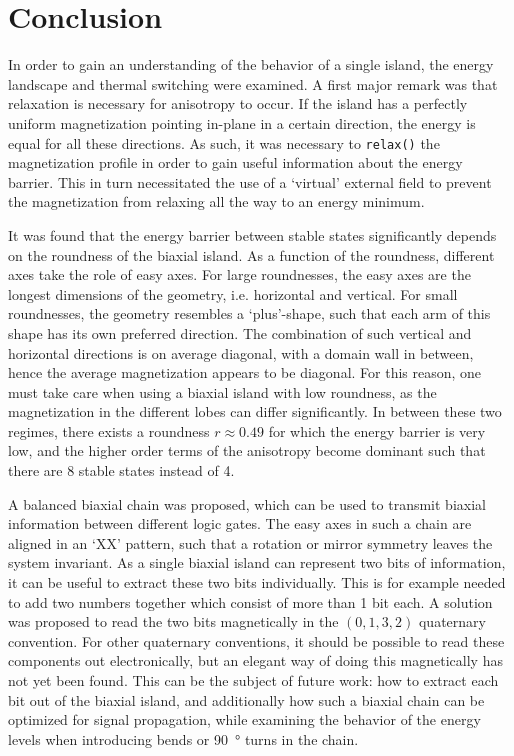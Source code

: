 \documentclass[11pt,a4paper,english]{article}
\newcommand{\code}[1]{\texttt{#1}}
\begin{document}
\clearpage
\section{Conclusion}
In order to gain an understanding of the behavior of a single island, the energy landscape and thermal switching were examined. A first major remark was that relaxation is necessary for anisotropy to occur. If the island has a perfectly uniform magnetization pointing in-plane in a certain direction, the energy is equal for all these directions. As such, it was necessary to \code{relax()} the magnetization profile in order to gain useful information about the energy barrier. This in turn necessitated the use of a `virtual' external field to prevent the magnetization from relaxing all the way to an energy minimum. \par
It was found that the energy barrier between stable states significantly depends on the roundness of the biaxial island. As a function of the roundness, different axes take the role of easy axes. For large roundnesses, the easy axes are the longest dimensions of the geometry, i.e. horizontal and vertical. For small roundnesses, the geometry resembles a `plus'-shape, such that each arm of this shape has its own preferred direction. The combination of such vertical and horizontal directions is on average diagonal, with a domain wall in between, hence the average magnetization appears to be diagonal. For this reason, one must take care when using a biaxial island with low roundness, as the magnetization in the different lobes can differ significantly. In between these two regimes, there exists a roundness $r\approx0.49$ for which the energy barrier is very low, and the higher order terms of the anisotropy become dominant such that there are 8 stable states instead of 4. \par
A balanced biaxial chain was proposed, which can be used to transmit biaxial information between different logic gates. The easy axes in such a chain are aligned in an `XX' pattern, such that a rotation or mirror symmetry leaves the system invariant. As a single biaxial island can represent two bits of information, it can be useful to extract these two bits individually. This is for example needed to add two numbers together which consist of more than 1 bit each. A solution was proposed to read the two bits magnetically in the $(0,1,3,2)$ quaternary convention. For other quaternary conventions, it should be possible to read these components out electronically, but an elegant way of doing this magnetically has not yet been found. This can be the subject of future work: how to extract each bit out of the biaxial island, and additionally how such a biaxial chain can be optimized for signal propagation, while examining the behavior of the energy levels when introducing bends or \SI{90}{\degree} turns in the chain. \par
\end{document}
